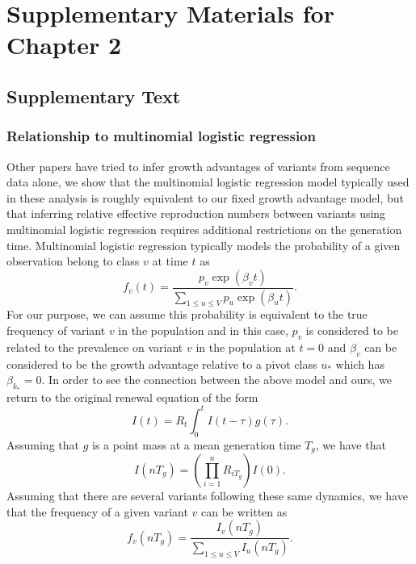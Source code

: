 \graphicspath{{./chapters/rt-from-frequency-dynamics/}}
\chapter{Supplementary Materials for Chapter 2} 

\section{Supplementary Text}

\subsection*{Relationship to multinomial logistic regression}

Other papers have tried to infer growth advantages of variants from sequence data alone, we show that the multinomial logistic regression model typically used in these analysis is roughly equivalent to our fixed growth advantage model, but that inferring relative effective reproduction numbers between variants using multinomial logistic regression requires additional restrictions on the generation time.
Multinomial logistic regression typically models the probability of a given observation belong to class $v$ at time $t$ as
\begin{equation}
  f_{v}(t) = \frac{p_{v}\exp(\beta_{v} t)}{\sum_{1\leq u\leq V} p_{u}\exp(\beta_{u} t)}.
\end{equation}
For our purpose, we can assume this probability is equivalent to the true frequency of variant $v$ in the population and in this case, $p_{v}$ is considered to be related to the prevalence on variant $v$ in the population at $t=0$ and $\beta_{v}$ can be considered to be the growth advantage relative to a pivot class $u_{*}$ which has $\beta_{k_{*}} = 0$.
In order to see the connection between the above model and ours, we return to the original renewal equation of the form
\begin{equation}
  I(t) = R_{t}\int_{0}^{t} I(t-\tau) g(\tau).
\end{equation}
Assuming that $g$  is a point mass at a mean generation time $T_{g}$, we have that
\begin{equation}
  I(nT_{g}) = \left(\prod_{i=1}^{n} R_{iT_{g}}\right) I(0).
\end{equation}
Assuming that there are several variants following these same dynamics, we have that the frequency of a given variant $v$ can be written as
\begin{equation}
  f_{v}(nT_{g}) = \frac{I_{v}(nT_{g})}{\sum_{1\leq u \leq V} I_{u}(nT_{g})}.
\end{equation}
